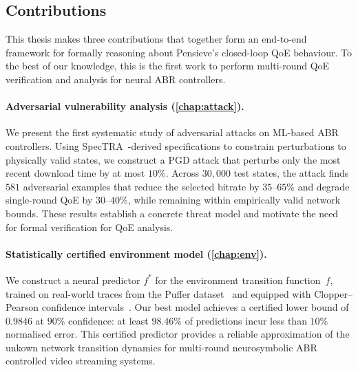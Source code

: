\documentclass[thesis]{uofithesis} %
\begin{document}
    \subsection{Contributions}
    \label{subsec:contributions}
 
    This thesis makes three contributions that together form an
    end-to-end framework for formally reasoning about Pensieve's
    closed-loop QoE behaviour.  To the best of our knowledge, this is
    the first work to perform multi-round QoE verification and analysis
    for neural ABR controllers.
 
    \paragraph{Adversarial vulnerability analysis
               (\ref{chap:attack}).}
    We present the first systematic study of adversarial attacks on
    ML-based ABR controllers.  Using SpecTRA~\cite{spec-tra}-derived specifications to
    constrain perturbations to physically valid states, we construct a
    PGD attack that perturbs only the most recent download time by at
    most $10\%$.  Across $30{,}000$ test states, the attack finds $581$
    adversarial examples that reduce the selected bitrate by
    $35$--$65\%$ and degrade single-round QoE by $30$--$40\%$, while
    remaining within empirically valid network bounds.  These results
    establish a concrete threat model and motivate the need for formal
    verification for QoE analysis.

    \paragraph{Statistically certified environment model
               (\ref{chap:env}).}
    We construct a neural predictor $f^{\ast}$ for the
    environment transition function~$f$, trained on real-world traces
    from the Puffer dataset~\cite{fugu} and equipped with
    Clopper--Pearson confidence intervals~\cite{clopper-pearson}.
    Our best model achieves a certified lower bound of
    $0.9846$ at $90\%$ confidence: at least $98.46\%$ of predictions
    incur less than $10\%$ normalised error.  This certified predictor
    provides a reliable approximation of the unkown network transition dynamics
    for multi-round neurosymbolic ABR controlled video streaming systems.
\end{document}
